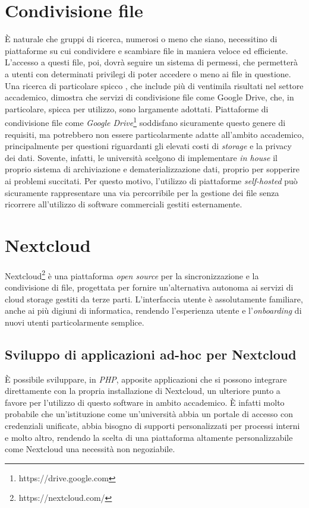 \section{Condivisione file}
È naturale che gruppi di ricerca, numerosi o meno che siano, necessitino di piattaforme su cui condividere e scambiare file in maniera veloce ed efficiente. L'accesso a questi file, poi, dovrà seguire un sistema di permessi, che permetterà a utenti con determinati privilegi di poter accedere o meno ai file in questione.\newline
Una ricerca di particolare spicco \cite{bosman_2016_49583}, che include più di ventimila risultati nel settore accademico, dimostra che servizi di condivisione file come Google Drive, che, in particolare, spicca per utilizzo, sono largamente adottati. Piattaforme di condivisione file come \textit{Google Drive}\footnote{https://drive.google.com} soddisfano sicuramente questo genere di requisiti, ma potrebbero non essere particolarmente adatte all'ambito accademico, principalmente per questioni riguardanti gli elevati costi di \textit{storage} e la privacy dei dati.
\newline
Sovente, infatti, le università scelgono di implementare \textit{in house} il proprio sistema di archiviazione e dematerializzazione dati, proprio per sopperire ai problemi succitati. Per questo motivo, l'utilizzo di piattaforme \textit{self-hosted} può sicuramente rappresentare una via percorribile per la gestione dei file senza ricorrere all'utilizzo di software commerciali gestiti esternamente.

\section{Nextcloud}
Nextcloud\footnote{https://nextcloud.com/} è una piattaforma \textit{open source} per la sincronizzazione e la condivisione di file, progettata per fornire un'alternativa autonoma ai servizi di cloud storage gestiti da terze parti. L'interfaccia utente è assolutamente familiare, anche ai più digiuni di informatica, rendendo l'esperienza utente e l'\textit{onboarding} di nuovi utenti particolarmente semplice.

\subsection{Sviluppo di applicazioni {ad-hoc} per Nextcloud}
È possibile sviluppare, in \textit{PHP}, apposite applicazioni che si possono integrare direttamente con la propria installazione di Nextcloud, un ulteriore punto a favore per l'utilizzo di questo software in ambito accademico.
\newline
È infatti molto probabile che un'istituzione come un'università abbia un portale di accesso con credenziali unificate, abbia bisogno di supporti personalizzati per processi interni e molto altro, rendendo la scelta di una piattaforma altamente personalizzabile come Nextcloud una necessità non negoziabile. 

